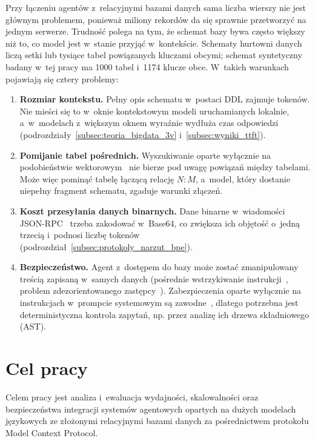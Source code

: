 Przy łączeniu agentów z~relacyjnymi bazami danych sama liczba wierszy nie jest głównym problemem, ponieważ miliony rekordów da się sprawnie przetworzyć na jednym serwerze. Trudność polega na tym, że schemat bazy bywa często większy niż to, co model jest w~stanie przyjąć w~kontekście. Schematy hurtowni danych liczą setki lub tysiące tabel powiązanych kluczami obcymi; schemat syntetyczny badany w~tej pracy ma 1000 tabel i~1174 klucze obce. W~takich warunkach pojawiają się cztery problemy:
\begin{enumerate}
    \item \textbf{Rozmiar kontekstu.} Pełny opis schematu w~postaci DDL zajmuje \wynFullDumpTokens{} tokenów. Nie mieści się to w~oknie kontekstowym modeli uruchamianych lokalnie, a~w~modelach z~większym oknem wyraźnie wydłuża czas odpowiedzi (podrozdziały~\ref{subsec:teoria_bigdata_3v} i~\ref{subsec:wyniki_ttft}).
    \item \textbf{Pomijanie tabel pośrednich.} Wyszukiwanie oparte wyłącznie na podobieństwie wektorowym~\cite{lewis2020rag} nie bierze pod uwagę powiązań między tabelami. Może więc pominąć tabelę łączącą relację $N:M$, a~model, który dostanie niepełny fragment schematu, zgaduje warunki złączeń.
    \item \textbf{Koszt przesyłania danych binarnych.} Dane binarne w~wiadomości JSON-RPC~\cite{rfc8259} trzeba zakodować w~Base64, co zwiększa ich objętość o~jedną trzecią i~podnosi liczbę tokenów (podrozdział~\ref{subsec:protokoly_narzut_bpe}).
    \item \textbf{Bezpieczeństwo.} Agent z~dostępem do bazy może zostać zmanipulowany treścią zapisaną w~samych danych (pośrednie wstrzykiwanie instrukcji~\cite{greshake2023promptinjection,owasp_llm_2025}, problem zdezorientowanego zastępcy~\cite{hardy1988confused_deputy}). Zabezpieczenia oparte wyłącznie na instrukcjach w~prompcie systemowym są zawodne~\cite{pedro2023prompt2sql}, dlatego potrzebna jest deterministyczna kontrola zapytań, np. przez analizę ich drzewa składniowego (AST).
\end{enumerate}


\section{Cel pracy}
\label{sec:wstep_cel_zakres}

Celem pracy jest analiza i~ewaluacja wydajności, skalowalności oraz bezpieczeństwa integracji systemów agentowych opartych na dużych modelach językowych ze złożonymi relacyjnymi bazami danych za pośrednictwem protokołu Model Context Protocol.

